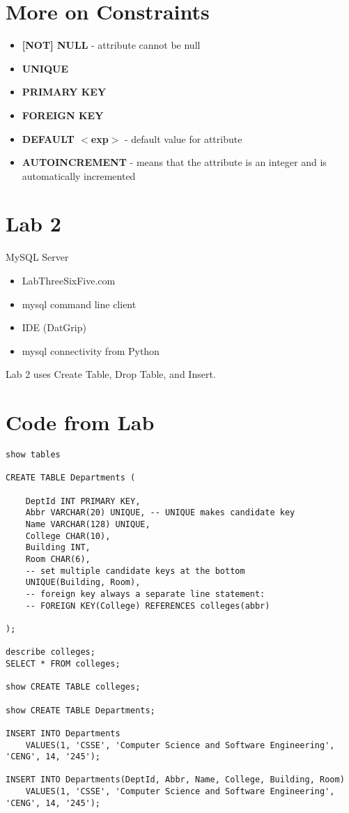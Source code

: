 \documentclass[twoside]{article}
\begin{document}
\section*{More on Constraints}
\begin{itemize}
    \item \textbf{[NOT] NULL} - attribute cannot be null
    \item \textbf{UNIQUE}
    \item \textbf{PRIMARY KEY}
    \item \textbf{FOREIGN KEY}
    \item \textbf{DEFAULT $<$exp$>$} - default value for attribute
    \item \textbf{AUTO\textunderscore INCREMENT} - means that the attribute is 
    an integer and is automatically incremented
\end{itemize}

\section*{Lab 2}
MySQL Server
\begin{itemize}
    \item LabThreeSixFive.com
    \item mysql command line client
    \item IDE (DatGrip)
    \item mysql connectivity from Python
\end{itemize}

Lab 2 uses Create Table, Drop Table, and Insert.

\section*{Code from Lab}
\begin{verbatim}
show tables

CREATE TABLE Departments (
    
    DeptId INT PRIMARY KEY, 
    Abbr VARCHAR(20) UNIQUE, -- UNIQUE makes candidate key
    Name VARCHAR(128) UNIQUE,
    College CHAR(10),
    Building INT,
    Room CHAR(6),
    -- set multiple candidate keys at the bottom
    UNIQUE(Building, Room),
    -- foreign key always a separate line statement:
    -- FOREIGN KEY(College) REFERENCES colleges(abbr)
    
);

describe colleges;
SELECT * FROM colleges;

show CREATE TABLE colleges;

show CREATE TABLE Departments;

INSERT INTO Departments 
    VALUES(1, 'CSSE', 'Computer Science and Software Engineering', 'CENG', 14, '245');
    
INSERT INTO Departments(DeptId, Abbr, Name, College, Building, Room)
    VALUES(1, 'CSSE', 'Computer Science and Software Engineering', 'CENG', 14, '245');

\end{verbatim}
\end{document}
